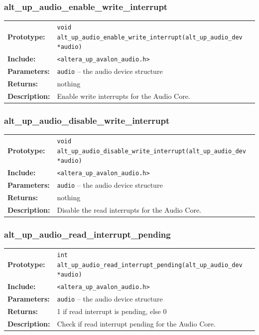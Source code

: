 \subsubsection{alt\_up\_audio\_enable\_write\_interrupt}
\begin{tabular}[ht]{lp{11cm}}
	\textbf{Prototype:}
	&
	\texttt{void alt\_up\_audio\_enable\_write\_interrupt(alt\_up\_audio\_dev *audio)} 
	\\
	\textbf{Include:}
	&
	{\tt <altera\_up\_avalon\_audio.h>}
	\\
	{\textbf{Parameters:}}
	&
	\texttt{{audio}}
	 -- the audio device structure 
	\\
	\textbf{Returns:}
	& nothing
	\\
	\textbf{Description:}
	& Enable write interrupts for the Audio Core.\\
\end{tabular}
\vfill

\subsubsection{alt\_up\_audio\_disable\_write\_interrupt}
\begin{tabular}[ht]{lp{11cm}}
	\textbf{Prototype:}
	&
	\texttt{void alt\_up\_audio\_disable\_write\_interrupt(alt\_up\_audio\_dev *audio)} 
	\\
	\textbf{Include:}
	&
	{\tt <altera\_up\_avalon\_audio.h>}
	\\
	{\textbf{Parameters:}}
	&
	\texttt{{audio}}
	 -- the audio device structure 
	\\
	\textbf{Returns:}
	& nothing
	\\
	\textbf{Description:}
	& Disable the read interrupts for the Audio Core.\\
\end{tabular}
\vfill

\subsubsection{alt\_up\_audio\_read\_interrupt\_pending}
\begin{tabular}[ht]{lp{11cm}}
	\textbf{Prototype:}
	&
	\texttt{int alt\_up\_audio\_read\_interrupt\_pending(alt\_up\_audio\_dev *audio)} 
	\\
	\textbf{Include:}
	&
	{\tt <altera\_up\_avalon\_audio.h>}
	\\
	{\textbf{Parameters:}}
	&
	\texttt{{audio}}
	 -- the audio device structure 
	\\
	\textbf{Returns:}
	& 1 if read interrupt is pending, else 0
	\\
	\textbf{Description:}
	& Check if read interrupt pending for the Audio Core.\\
\end{tabular}
\vfill

